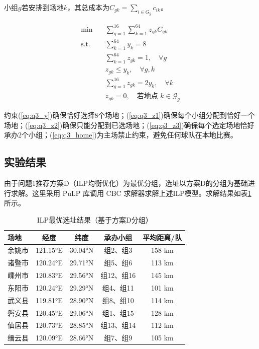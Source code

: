 \documentclass[12pt,a4paper]{article}
\begin{document}
小组$g$若安排到场地$k$，其总成本为$C_{gk} = \sum_{i \in G_g} c_{ik}$。

\begin{align}
  \min \quad & \sum_{g=1}^{16} \sum_{k=1}^{64} z_{gk} C_{gk} \label{eq:q3_obj} \\
  \text{s.t.} \quad & \sum_{k=1}^{64} y_k = 8 \label{eq:q3_y} \\
  & \sum_{k=1}^{64} z_{gk} = 1,\quad \forall g \label{eq:q3_z1} \\
  & z_{gk} \leq y_k,\quad \forall g,k \label{eq:q3_z2} \\
  & \sum_{g=1}^{16} z_{gk} = 2y_k,\quad \forall k \label{eq:q3_z3} \\
  & z_{gk}=0,\quad \text{若地点 } k \in \mathcal{G}_g \label{eq:q3_home}
\end{align}

约束(\ref{eq:q3_y})确保恰好选择8个场地；(\ref{eq:q3_z1})确保每个小组分配到恰好一个场地；(\ref{eq:q3_z2})确保只能分配到已选场地；(\ref{eq:q3_z3})确保每个选定场地恰好承办2个小组；(\ref{eq:q3_home})为主场禁止约束，避免任何球队在本地比赛。

\subsection{实验结果}

由于问题1推荐方案D（ILP均衡优化）为最优分组，选址以方案D的分组为基础进行求解。这里采用 PuLP 库调用 CBC 求解器求解上述ILP模型。求解结果如表\ref{tab:q3_ilp}所示。

\begin{table}[H]
  \centering
  \caption{ILP最优选址结果（基于方案D分组）}
  \label{tab:q3_ilp}
  \begin{tabular}{lcccc}
    \toprule
    场地 & 经度 & 纬度 & 承办小组 & 平均距离/队 \\
    \midrule
    余姚市 & 121.15°E & 30.04°N & 组2、组3 & 158 km \\
    诸暨市 & 120.24°E & 29.71°N & 组5、组6 & 113 km \\
    嵊州市 & 120.83°E & 29.56°N & 组12、组16 & 145 km \\
    东阳市 & 120.24°E & 29.29°N & 组4、组11 & 101 km \\
    武义县 & 119.81°E & 28.90°N & 组8、组10 & 114 km \\
    磐安县 & 120.45°E & 29.06°N & 组1、组15 & 128 km \\
    仙居县 & 120.73°E & 28.85°N & 组13、组14 & 112 km \\
    缙云县 & 120.09°E & 28.66°N & 组7、组9 & 105 km \\
    \bottomrule
  \end{tabular}
\end{table}
\end{document}
